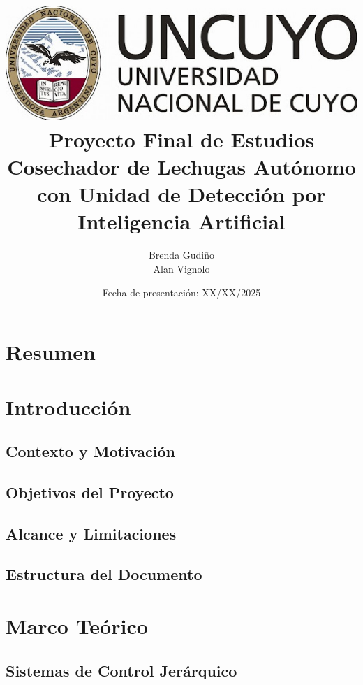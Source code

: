 \documentclass[a4paper,12pt]{report}
\title{
\includegraphics[scale = 0.3]{logo_uncuyo.png} \\ [2cm]
{\Huge \textbf{Proyecto Final de Estudios} \\ [1cm] 
Cosechador de Lechugas Autónomo con Unidad de Detección por Inteligencia Artificial}}
\author{Brenda Gudiño \\ Alan Vignolo}
\date{{Fecha de presentación: XX/XX/2025}}
\begin{document}

\maketitle
\tableofcontents 
\newpage

\chapter*{Resumen}


\chapter{Introducción}

\section{Contexto y Motivación}


\section{Objetivos del Proyecto}


\section{Alcance y Limitaciones}


\section{Estructura del Documento}


\chapter{Marco Teórico}

\section{Sistemas de Control Jerárquico}




\end{document}
